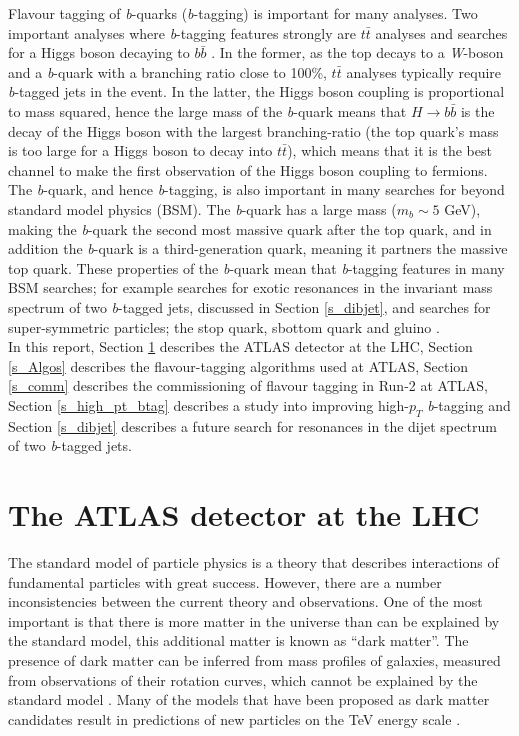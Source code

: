 \documentclass[12pt, onecolumn,notitlepage]{article}
\begin{document}
Flavour tagging of \textit{b}-quarks (\textit{b}-tagging) is important for many analyses.
Two important analyses where \textit{b}-tagging features strongly are $t\bar{t}$ analyses \cite{bib_ttbar}
and searches for a Higgs boson decaying to $b\bar{b}$ \cite{bib_Hbb}.
In the former, as the top decays to a \textit{W}-boson and a \textit{b}-quark with a branching ratio close to 100\%, 
$t\bar{t}$ analyses typically require \textit{b}-tagged jets in the event. 
In the latter, the Higgs boson coupling is proportional to mass squared, hence the large mass of the \textit{b}-quark means that $H\to b\bar{b}$ is 
the decay of the Higgs boson with the largest branching-ratio (the top quark's mass is too large for a Higgs boson to decay into $t\bar{t}$), 
which means that it is the best channel to make the first observation of the Higgs boson coupling to fermions. \\

The \textit{b}-quark, and hence \textit{b}-tagging, is also important in many searches for beyond standard model physics (BSM). 
The \textit{b}-quark has a large mass ($m_b \sim 5$ GeV), making the \textit{b}-quark the second most massive quark after the top quark, and in addition 
the \textit{b}-quark is a  third-generation quark, meaning it partners the massive top quark.
These properties of the \textit{b}-quark mean that \textit{b}-tagging features in many BSM searches; 
for example searches for exotic resonances in the invariant mass spectrum of two \textit{b}-tagged jets, discussed in Section \ref{s_dibjet}, 
and searches for super-symmetric particles; the stop quark, sbottom quark and gluino \cite{bib_susy}. \\

In this report, Section \ref{s_ATLAS} describes the ATLAS detector at the LHC, Section \ref{s_Algos} describes the flavour-tagging algorithms used at ATLAS,
Section \ref{s_comm} describes the commissioning of flavour tagging in Run-2 at ATLAS, Section \ref{s_high_pt_btag} describes a study into improving 
high-$p_T$ \textit{b}-tagging and Section \ref{s_dibjet} describes a future search for resonances in the dijet spectrum of two \textit{b}-tagged jets.

\section{The ATLAS detector at the LHC}  \label{s_ATLAS}

The standard model of particle physics is a theory that describes interactions of fundamental particles with great success.
However, there are a number inconsistencies between the current theory and observations. 
One of the most important is that there is more matter in the universe than can be explained by the standard model, this additional matter is known as ``dark matter''.
The presence of dark matter can be inferred from mass profiles of galaxies, measured from observations of their rotation curves, which cannot be explained by the standard model \cite{bib_galaxy}.
Many of the models that have been proposed as dark matter candidates result in predictions of new particles on the TeV energy scale \cite{bib_DM}.\\
\end{document}

